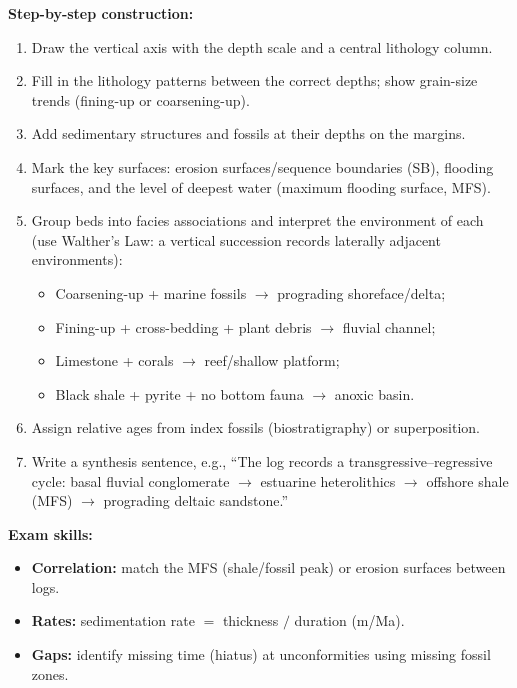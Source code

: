 \documentclass[11pt]{article}
\newcommand{\cle}[1]{{\popxbold\color{popdark}#1}}
\begin{document}
\begin{methode}
\textbf{Step-by-step construction:}
\begin{enumerate}
    \item Draw the vertical axis with the depth scale and a central lithology column.
    \item Fill in the lithology patterns between the correct depths; show grain-size trends (fining-up or coarsening-up).
    \item Add sedimentary structures and fossils at their depths on the margins.
    \item Mark the key surfaces: erosion surfaces/sequence boundaries (SB), flooding surfaces, and the level of deepest water (\cle{maximum flooding surface}, MFS).
    \item Group beds into \cle{facies associations} and interpret the environment of each (use \cle{Walther's Law}: a vertical succession records laterally adjacent environments):
    \begin{itemize}
        \item Coarsening-up + marine fossils $\rightarrow$ prograding shoreface/delta;
        \item Fining-up + cross-bedding + plant debris $\rightarrow$ fluvial channel;
        \item Limestone + corals $\rightarrow$ reef/shallow platform;
        \item Black shale + pyrite + no bottom fauna $\rightarrow$ anoxic basin.
    \end{itemize}
    \item Assign relative ages from index fossils (biostratigraphy) or superposition.
    \item Write a synthesis sentence, e.g., ``The log records a transgressive--regressive cycle: basal fluvial conglomerate $\rightarrow$ estuarine heterolithics $\rightarrow$ offshore shale (MFS) $\rightarrow$ prograding deltaic sandstone.''
\end{enumerate}

\textbf{Exam skills:}
\begin{itemize}
    \item \textbf{Correlation:} match the MFS (shale/fossil peak) or erosion surfaces between logs.
    \item \textbf{Rates:} sedimentation rate $=$ thickness $/$ duration (m/Ma).
    \item \textbf{Gaps:} identify missing time (hiatus) at unconformities using missing fossil zones.
\end{itemize}
\end{methode}
\end{document}
